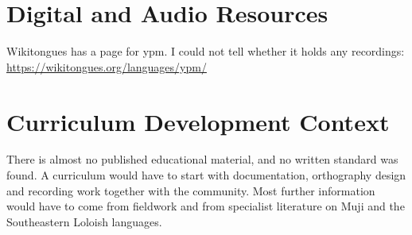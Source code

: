 \documentclass[12pt]{article}
\begin{document}
\section{Digital and Audio Resources}
Wikitongues has a page for ypm. I could not tell whether it holds any recordings: \url{https://wikitongues.org/languages/ypm/}

\section{Curriculum Development Context}
There is almost no published educational material, and no written standard was found. A curriculum would have to start with documentation, orthography design and recording work together with the community. Most further information would have to come from fieldwork and from specialist literature on Muji and the Southeastern Loloish languages.
\end{document}

